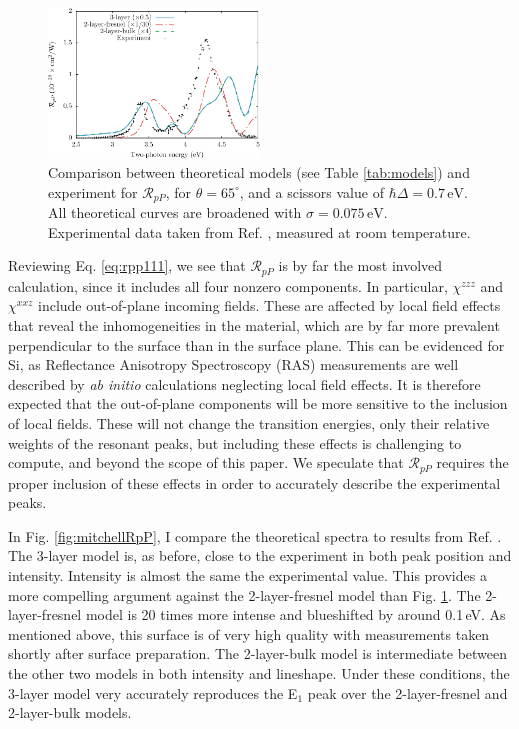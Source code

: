 \begin{figure}[H]
\centering 
\includegraphics[width=0.5\textwidth]{content/figures/fig-4_4_05}
\caption{Comparison between theoretical models (see Table \ref{tab:models}) and
experiment for $\mathcal{R}_{pP}$, for $\theta=65^{\circ}$, and a scissors
value of $\hbar\Delta = 0.7\,\text{eV}$. All theoretical curves are broadened
with $\sigma=0.075\,\text{eV}$. Experimental data taken from Ref.
\cite{mejiaPRB02}, measured at room temperature.}
\label{fig:RpP}
\end{figure}

Reviewing Eq. \eqref{eq:rpp111}, we see that $\mathcal{R}_{pP}$ is by far the
most involved calculation, since it includes all four nonzero components. In
particular, $\chi^{zzz}$ and $\chi^{xxz}$ include out-of-plane incoming fields.
These are affected by local field effects\cite{tancognedejean:tel-01235611} that
reveal the inhomogeneities in the material, which are by far more prevalent
perpendicular to the surface than in the surface plane. This can be evidenced
for Si, as Reflectance Anisotropy Spectroscopy (RAS) measurements are well
described by \emph{ab initio} calculations neglecting local field
effects.\cite{palummoPRB99, gaalPRB09} It is therefore expected that the
out-of-plane components will be more sensitive to the inclusion of local fields.
These will not change the transition energies, only their relative weights of
the resonant peaks,\cite{tancognedejean:tel-01235611} but including these
effects is challenging to compute,\cite{nicolasPRB15} and beyond the scope of
this paper. We speculate that $\mathcal{R}_{pP}$ requires the proper inclusion
of these effects in order to accurately describe the experimental peaks.

In Fig. \ref{fig:mitchellRpP}, I compare the theoretical spectra to results from
Ref. \cite{mitchellSS01}. The 3-layer model is, as before, close to the
experiment in both peak position and intensity. Intensity is almost the same the
experimental value. This provides a more compelling argument against the
2-layer-fresnel model than Fig. \ref{fig:RpP}. The 2-layer-fresnel model is 20
times more intense and blueshifted by around 0.1\,eV. As mentioned above, this
surface is of very high quality with measurements taken shortly after surface
preparation. The 2-layer-bulk model is intermediate between the other two models
in both intensity and lineshape. Under these conditions, the 3-layer model very
accurately reproduces the E$_{1}$ peak over the 2-layer-fresnel and 2-layer-bulk
models.

